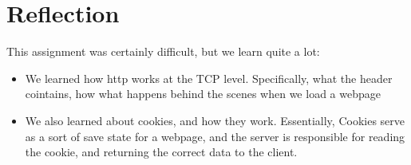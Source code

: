 \documentclass{article}
\begin{document}
\section{Reflection}

This assignment was certainly difficult, but we learn quite a lot:
\begin{itemize}
    \item We learned how http works at the TCP level. Specifically, what the header cointains, how what happens behind the scenes when we load a webpage
    \item We also learned about cookies, and how they work. Essentially, Cookies serve as a sort of save state for a webpage, and the server is responsible for reading the cookie, and returning the correct data to the client.
\end{itemize}
\end{document}
